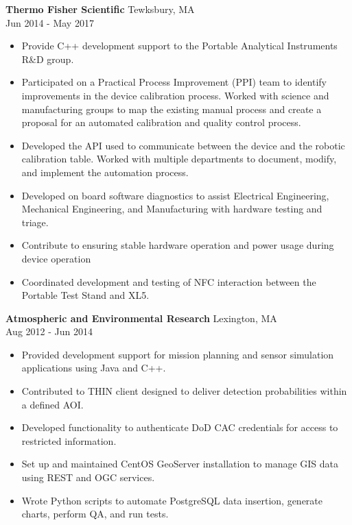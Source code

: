 \documentclass[10pt]{article}
\newcommand{\verticalspace}{\vspace{1.5mm}}
\begin{document}
\verticalspace

{\bf Thermo Fisher Scientific} \hfill Tewksbury, MA \\
 \hfill Jun 2014 - May 2017
\begin{itemize}
\item Provide C++ development support to the Portable Analytical Instruments R\&D group.
\item Participated on a Practical Process Improvement (PPI) team to identify improvements in the device calibration process.  Worked with science and manufacturing groups to map the existing manual process and create a proposal for an automated calibration and quality control process.
\item Developed the API used to communicate between the device and the robotic calibration table.  Worked with multiple departments to document, modify, and implement the automation process.
\item Developed on board software diagnostics to assist Electrical Engineering, Mechanical Engineering, and Manufacturing with hardware testing and triage.
\item Contribute to ensuring stable hardware operation and power usage during device operation
\item Coordinated development and testing of NFC interaction between the Portable Test Stand and XL5. 
\end{itemize}

\verticalspace

{\bf Atmospheric and Environmental Research} \hfill Lexington, MA \\
 \hfill Aug 2012 - Jun 2014
\begin{itemize}
\item Provided development support for mission planning and sensor simulation applications using Java and C++.
\item Contributed to THIN client designed to deliver detection probabilities within a defined AOI.
\item Developed functionality to authenticate DoD CAC credentials for access to restricted information.
\item Set up and maintained CentOS GeoServer installation to manage GIS data using REST and OGC services.
\item Wrote Python scripts to automate PostgreSQL data insertion, generate charts, perform QA, and run tests.
\end{itemize}
\end{document}
